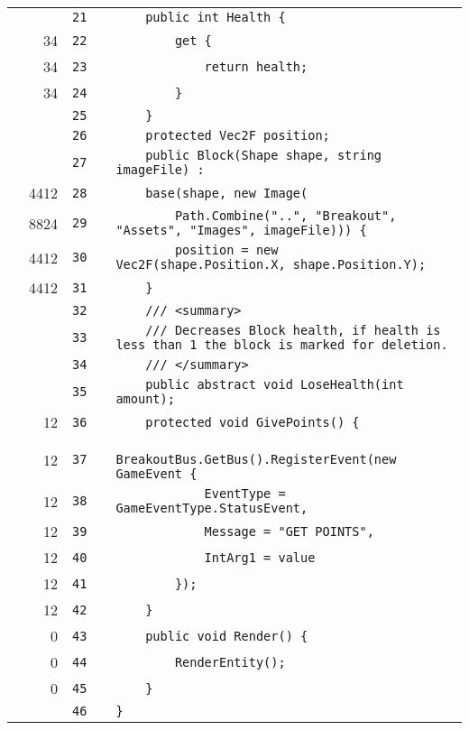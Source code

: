 \documentclass[a4paper,landscape,10pt]{article}
\begin{document}
\begin{longtable}[l]{lrrll}
\cellcolor{gray} &  & \verb~21~ & & \verb~    public int Health {~\\
\cellcolor{green} & 34 & \verb~22~ & & \verb~        get {~\\
\cellcolor{green} & 34 & \verb~23~ & & \verb~            return health;~\\
\cellcolor{green} & 34 & \verb~24~ & & \verb~        }~\\
\cellcolor{gray} &  & \verb~25~ & & \verb~    }~\\
\cellcolor{gray} &  & \verb~26~ & & \verb~    protected Vec2F position;~\\
\cellcolor{gray} &  & \verb~27~ & & \verb~    public Block(Shape shape, string imageFile) :~\\
\cellcolor{green} & 4412 & \verb~28~ & & \verb~    base(shape, new Image(~\\
\cellcolor{green} & 8824 & \verb~29~ & & \verb~        Path.Combine("..", "Breakout", "Assets", "Images", imageFile))) {~\\
\cellcolor{green} & 4412 & \verb~30~ & & \verb~        position = new Vec2F(shape.Position.X, shape.Position.Y);~\\
\cellcolor{green} & 4412 & \verb~31~ & & \verb~    }~\\
\cellcolor{gray} &  & \verb~32~ & & \verb~    /// <summary>~\\
\cellcolor{gray} &  & \verb~33~ & & \verb~    /// Decreases Block health, if health is less than 1 the block is marked for deletion.~\\
\cellcolor{gray} &  & \verb~34~ & & \verb~    /// </summary>~\\
\cellcolor{gray} &  & \verb~35~ & & \verb~    public abstract void LoseHealth(int amount);~\\
\cellcolor{green} & 12 & \verb~36~ & & \verb~    protected void GivePoints() {~\\
\cellcolor{green} & 12 & \verb~37~ & & \verb~        BreakoutBus.GetBus().RegisterEvent(new GameEvent {~\\
\cellcolor{green} & 12 & \verb~38~ & & \verb~            EventType = GameEventType.StatusEvent,~\\
\cellcolor{green} & 12 & \verb~39~ & & \verb~            Message = "GET POINTS",~\\
\cellcolor{green} & 12 & \verb~40~ & & \verb~            IntArg1 = value~\\
\cellcolor{green} & 12 & \verb~41~ & & \verb~        });~\\
\cellcolor{green} & 12 & \verb~42~ & & \verb~    }~\\
\cellcolor{red} & 0 & \verb~43~ & & \verb~    public void Render() {~\\
\cellcolor{red} & 0 & \verb~44~ & & \verb~        RenderEntity();~\\
\cellcolor{red} & 0 & \verb~45~ & & \verb~    }~\\
\cellcolor{gray} &  & \verb~46~ & & \verb~}~\\
\end{longtable}
\newpage
\end{document}
